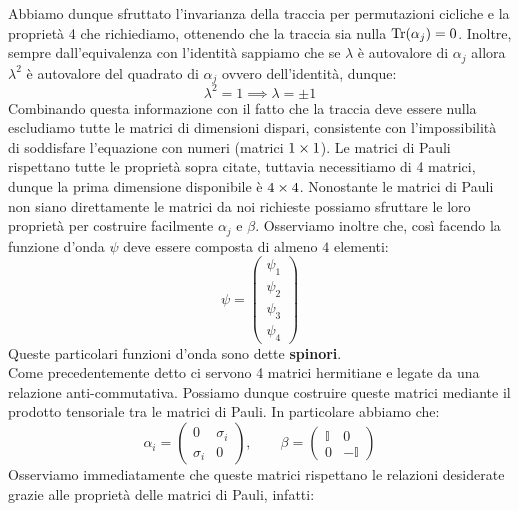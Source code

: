 Abbiamo dunque sfruttato l'invarianza della traccia per permutazioni cicliche e la proprietà 4 che richiediamo, ottenendo che la traccia sia nulla $\Tr (\alpha_j) = 0$.
Inoltre, sempre dall'equivalenza con l'identità sappiamo che se $\lambda$ è autovalore di $\alpha_j$ allora $\lambda^2$ è autovalore del quadrato di $\alpha_j$ ovvero dell'identità, dunque:
\begin{equation}
    \lambda^2 = 1 \implies \lambda = \pm 1
\end{equation}
Combinando questa informazione con il fatto che la traccia deve essere nulla escludiamo tutte le matrici di dimensioni dispari, consistente con l'impossibilità di soddisfare l'equazione con numeri (matrici $1 \times 1$).
Le matrici di Pauli rispettano tutte le proprietà sopra citate, tuttavia necessitiamo di 4 matrici, dunque la prima dimensione disponibile è $4 \times 4$. Nonostante le matrici di Pauli non siano direttamente le matrici da noi richieste possiamo sfruttare le loro proprietà per costruire facilmente $\alpha_j$ e $\beta$.
Osserviamo inoltre che, così facendo la funzione d'onda $\psi$ deve essere composta di almeno $4$ elementi:
\begin{equation}
    \psi = \begin{pmatrix}
    \psi_1 \\
    \psi_2 \\
    \psi_3 \\
    \psi_4
    \end{pmatrix}
\end{equation}
Queste particolari funzioni d'onda sono dette \textbf{spinori}.\\
Come precedentemente detto ci servono 4 matrici hermitiane e legate da una relazione anti-commutativa. Possiamo dunque costruire queste matrici mediante il prodotto tensoriale tra le matrici di Pauli. In particolare abbiamo che:
\begin{equation}
  \alpha_i = \begin{pmatrix}
    0 & \sigma_i \\
    \sigma_i & 0
  \end{pmatrix}, \qquad
  \beta = \begin{pmatrix}
    \mathbb{I} & 0 \\
    0 & -\mathbb{I}
  \end{pmatrix}
\end{equation}
Osserviamo immediatamente che queste matrici rispettano le relazioni desiderate grazie alle proprietà delle matrici di Pauli, infatti:
